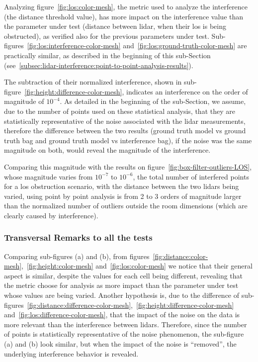 Analyzing figure~\ref{fig:los:color-mesh}, the metric used to analyze the interference (the distance threshold value), has more impact on the interference value than the parameter under test (distance between \ac{lidar}, when their \ac{los} is being obstructed), as verified also for the previous parameters under test. Sub-figures~\ref{fig:los:interference-color-mesh} and~\ref{fig:los:ground-truth-color-mesh} are practically similar, as described in the beginning of this sub-Section (see~\ref{subsec:lidar-interference:point-to-point-analysis-results}).

The subtraction of their normalized interference, shown in sub-figure~\ref{fig:height:difference-color-mesh}, indicates an interference on the order of magnitude of $10^{-4}$. As detailed in the beginning of the sub-Section, we assume, due to the number of points used on these statistical analysis, that they are statistically representative of the noise associated with the \ac{lidar} measurements, therefore the difference between the two results (ground truth model vs ground truth bag and ground truth model vs interference bag), if the noise was the same magnitude on both, would reveal the magnitude of the interference. 

Comparing this magnitude with the results on figure~\ref{fig:box-filter-outliers-LOS}, whose magnitude varies from $10^{-7}$ to $10^{-6}$, the total number of interfered points for a \ac{los} obstruction scenario, with the distance between the two \acp{lidar} being varied, using point by point analysis is from 2 to 3 orders of magnitude larger than the normalized number of outliers outside the room dimensions (which are clearly caused by interference).


\subsubsection{Transversal Remarks to all the tests}
Comparing sub-figures (a) and (b), from figures~\ref{fig:distance:color-mesh},~\ref{fig:height:color-mesh} and~\ref{fig:los:color-mesh} we notice that their general aspect is similar, despite the values for each cell being different, revealing that the metric choose for analysis as more impact than the parameter under test whose values are being varied. Another hypothesis is, due to the difference of sub-figures~\ref{fig:distance:difference-color-mesh},~\ref{fig:height:difference-color-mesh} and~\ref{fig:los:difference-color-mesh}, that the impact of the noise on the data is more relevant than the interference between \acp{lidar}. Therefore, since the number of points is statistically representative of the noise phenomenon, the sub-figure (a) and (b) look similar, but when the impact of the noise is ``removed'', the underlying interference behavior is revealed. 

